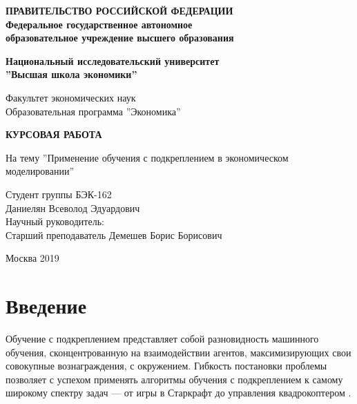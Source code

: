 \documentclass[12pt, a4paper]{extarticle}
\date{June 2019}
\theoremstyle{definition}
\begin{document}
\thispagestyle{empty}
\begin{center}
	\textbf{ПРАВИТЕЛЬСТВО РОССИЙСКОЙ ФЕДЕРАЦИИ}\\
	\vspace{2ex}
	\textbf{Федеральное государственное автономное\\ образовательное учреждение высшего образования}

	\vspace{2ex}

	\textbf{Национальный исследовательский университет \\ ''Высшая школа экономики''}

	\vspace{8ex}
	\begin{flushright}
	Факультет экономических наук\\
	Образовательная программа ''Экономика''
	\end{flushright}
\end{center}
\vspace{9ex}

\begin{center}
	{\textbf{КУРСОВАЯ РАБОТА
	}}
	\vspace{1ex}

	На тему ''Применение обучения с подкреплением в экономическом моделировании''
\end{center}
	\vspace{1ex}
\begin{flushright}
	\noindent
	Студент группы БЭК-162\\Даниелян Всеволод Эдуардович\\
	\vspace{13ex}
	Научный руководитель:\\
	Старший преподаватель Демешев Борис Борисович

\end{flushright}

	\vfill

\begin{center}
		Москва 2019

\end{center}
\newpage
\tableofcontents
\clearpage

\section{Введение}
Обучение с подкреплением представляет собой разновидность машинного обучения, сконцентрованную на взаимодействии агентов, максимизирующих свои совокупные вознаграждения, с окружением. Гибкость постановки проблемы позволяет с успехом применять алгоритмы обучения с подкреплением к самому широкому спектру задач --- от игры в Старкрафт \cite{alphastarblog} до управления квадрокоптером \cite{hwangbo2017control}.
\end{document}

